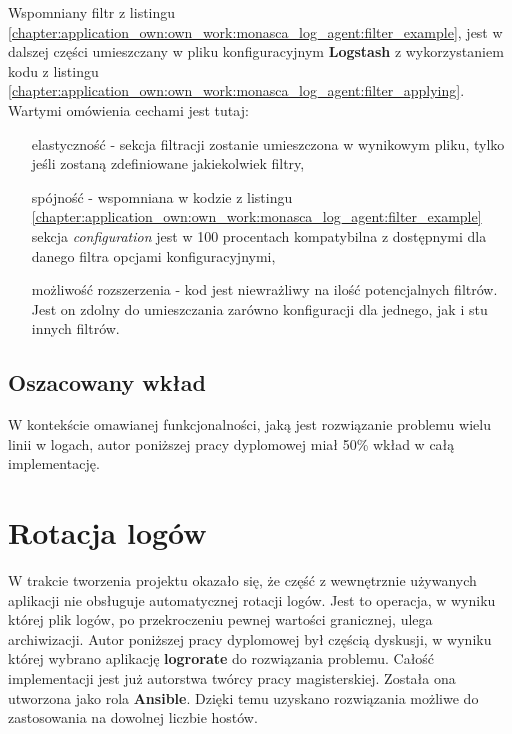     Wspomniany filtr z listingu \ref{chapter:application_own:own_work:monasca_log_agent:filter_example}, jest w dalszej części 
    umieszczany w pliku konfiguracyjnym \textbf{Logstash} z wykorzystaniem kodu z listingu 
    \ref{chapter:application_own:own_work:monasca_log_agent:filter_applying}. 
    Wartymi omówienia cechami jest tutaj:
    \begin{itemize}
        \item[elastyczność] - sekcja filtracji zostanie umieszczona w wynikowym pliku, tylko jeśli zostaną zdefiniowane jakiekolwiek filtry,
        \item[spójność] - wspomniana w kodzie z listingu \ref{chapter:application_own:own_work:monasca_log_agent:filter_example} 
        sekcja \textit{configuration} jest w 100 procentach kompatybilna z dostępnymi dla danego filtra opcjami konfiguracyjnymi,
        \item[możliwość rozszerzenia] - kod jest niewrażliwy na ilość potencjalnych filtrów. Jest on zdolny do umieszczania zarówno konfiguracji dla jednego, jak i stu innych filtrów. 
    \end{itemize}

    \subsection{Oszacowany wkład}
    W kontekście omawianej funkcjonalności, jaką jest rozwiązanie problemu wielu linii w logach, autor poniższej
    pracy dyplomowej miał 50\% wkład w całą implementację. 

\section{Rotacja logów}
    W trakcie tworzenia projektu okazało się, że część z wewnętrznie używanych aplikacji nie obsługuje automatycznej rotacji 
    logów. Jest to operacja, w wyniku której plik logów, po przekroczeniu pewnej wartości granicznej, ulega archiwizacji. 
    Autor poniższej pracy dyplomowej był częścią dyskusji, w wyniku której wybrano aplikację \textbf{logrorate} do rozwiązania problemu. Całość 
    implementacji jest już autorstwa twórcy pracy magisterskiej. Została ona utworzona jako rola \textbf{Ansible}. Dzięki 
    temu uzyskano rozwiązania możliwe do zastosowania na dowolnej liczbie hostów.

